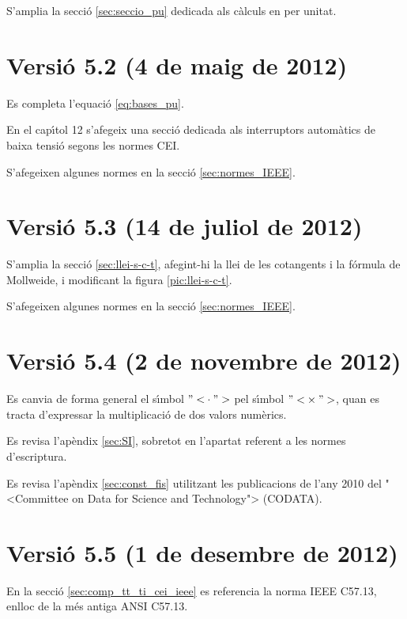 S'amplia la secci\'{o} \ref{sec:seccio_pu} dedicada als c\`{a}lculs en per unitat.


\section*{Versi\'{o} 5.2 (4 de maig de 2012)}

Es completa l'equaci\'{o} \eqref{eq:bases_pu}.

En el cap\'{\i}tol 12 s'afegeix una secci\'{o} dedicada als interruptors autom\`{a}tics de baixa tensi\'{o} segons les normes \textsf{CEI}.

S'afegeixen algunes normes en la secci\'{o} \ref{sec:normes_IEEE}.

\section*{Versi\'{o} 5.3 (14 de juliol de 2012)}

S'amplia la secci\'{o} \ref{sec:llei-s-c-t}, afegint-hi la llei de les cotangents i la f\'{o}rmula de Mollweide, i modificant  la figura \ref{pic:llei-s-c-t}.

S'afegeixen algunes normes en la secci\'{o} \ref{sec:normes_IEEE}.

\section*{Versi\'{o} 5.4 (2 de novembre de 2012)}

Es canvia de forma general el s\'{\i}mbol ${"<}\cdot{">}$ pel s\'{\i}mbol ${"<}\times{">}$, quan es tracta d'expressar la multiplicaci\'{o} de dos valors num\`{e}rics.

Es revisa l'ap\`{e}ndix \ref{sec:SI}, sobretot en l'apartat referent a les normes d'escriptura.

Es revisa l'ap\`{e}ndix \ref{sec:const_fis} utilitzant les publicacions de l'any 2010 del {"<}Committee on Data for Science and Technology{">} (\textsf{CODATA}).

\section*{Versi\'{o} 5.5 (1 de desembre de 2012)}

En la secci\'{o} \ref{sec:comp_tt_ti_cei_ieee} es referencia la norma  \textsf{IEEE C57.13}, enlloc de la m\'{e}s antiga \textsf{ANSI C57.13}.

